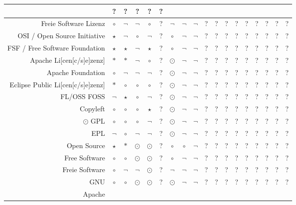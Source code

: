 \documentclass[DIV=calc,BCOR=5mm,11pt,headings=small,oneside,abstract=false, toc=bib]{scrartcl}
\begin{document}
\begin{table}
\begin{center}
\begin{tabular}[h]{|r|c|c|c||c||c|c|c|c||c|c|c|c|c|c|c|c||c|}
  & ? & ? & ? & ? & ?\\
\hline
Freie Software Lizenz
  & $\circ$ & $\neg$ & $\neg$ & $\circ$ & ? & $\neg$ 
  & $\neg$ & $\neg$ & ? & ? & ? & ?
  & ? & ? & ? & ? & ?\\
\hline
OSI / Open Source Initiative
  & $\star$ & $\neg$ & $\circ$ & $\neg$ & ? & $\circ$ 
  & $\neg$ & $\neg$ & ? & ? & ? & ?
  & ? & ? & ? & ? & ?\\
\hline
FSF / Free Software Foundation
  & $\star$ & $\star$ & $\neg$ & $\star$ & ? & $\circ$ 
  & $\neg$ & $\neg$ & ? & ? & ? & ?
  & ? & ? & ? & ? & ?\\
\hline
Apache Li[cen[c/s]e]zenz]
  & $\ast$ & $\ast$ & $\neg$ &  $\circ$ & ? & $\odot$
  & $\neg$ & $\neg$ & ? & ? & ? & ?
  & ? & ? & ? & ? & ?\\
\hline
Apache Foundation
  & $\circ$ & $\neg$ & $\neg$ & $\neg$ & ? & $\odot$
  & $\neg$ & $\neg$ & ? & ? & ? & ?
  & ? & ? & ? & ? & ?\\
\hline
Eclipse Public Li[cen[c/s]e]zenz]
  & $\ast$ & $\circ$ & $\circ$ & $\circ$ & ? & $\odot$
  & $\neg$ & $\neg$ & ? & ? & ? & ?
  & ? & ? & ? & ? & ?\\
\hline 
FL/OSS FOSS
  & $\neg$ & $\star$ & $\circ$ & $\neg$ & ? & $\odot$
  & $\neg$ & $\neg$ & ? & ? & ? & ?
  & ? & ? & ? & ? & ?\\
\hline
Copyleft
  & $\circ$ & $\circ$ & $\circ$ & $\star$ & ? & $\odot$
  & $\neg$ & $\neg$ & ? & ? & ? & ?
  & ? & ? & ? & ? & ?\\
\hline
\hline$\odot$
GPL
  & $\circ$ & $\circ$ & $\circ$ & $\neg$ & ? & $\odot$
  & $\neg$ & $\neg$ & ? & ? & ? & ?
  & ? & ? & ? & ? & ?\\
\hline
EPL
  & $\neg$ & $\circ$ & $\neg$ & $\neg$ & ? & $\odot$
  & $\neg$ & $\neg$ & ? & ? & ? & ?
  & ? & ? & ? & ? & ?\\
\hline 
\hline
Open Source
  & $\star$ & $\ast$ & $\odot$ & $\odot$ & ? & $\circ$ 
  & $\circ$ & $\neg$ & ? & ? & ? & ?
  & ? & ? & ? & ? & ?\\
\hline
Free Software
  & $\circ$ & $\circ$ & $\odot$ & $\odot$ & ? & $\circ$
  & $\neg$ & $\neg$ & ? & ? & ? & ?
  & ? & ? & ? & ? & ?\\
\hline
Freie Software
  & $\circ$ & $\neg$ & $\neg$ & $\odot$ & ? & $\neg$
  & $\neg$ & $\neg$ & ? & ? & ? & ?
  & ? & ? & ? & ? & ?\\
\hline
GNU
  & $\circ$ & $\circ$ & $\odot$ & $\odot$ & ? & $\odot$
  & $\neg$ & $\neg$ & ? & ? & ? & ?
  & ? & ? & ? & ? & ?\\
\hline
Apache

\end{tabular}
\end{center}
\end{table}
\end{document}
